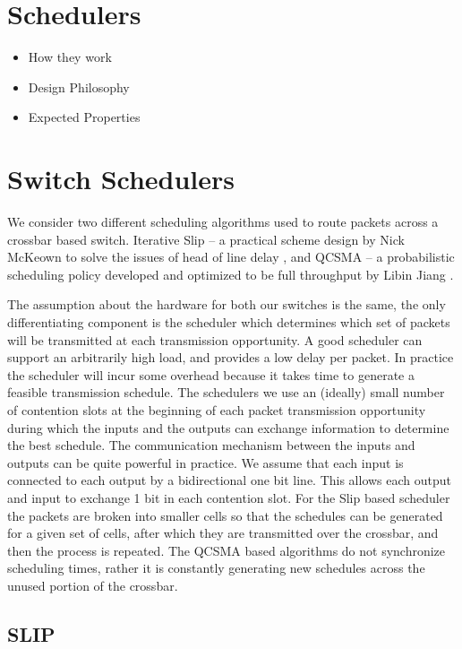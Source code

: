 \documentclass{IEEEtran}%
\begin{document}
\section{Schedulers}
\begin{itemize}
\item How they work
\item Design Philosophy
\item Expected Properties
\end{itemize}
\section{Switch Schedulers}
We consider two different scheduling algorithms used to route packets across a crossbar based switch.  Iterative Slip -- a practical scheme design by Nick McKeown to solve the issues of head of line delay \cite{McKeown}, and QCSMA -- a probabilistic scheduling policy developed and optimized to be full throughput by Libin Jiang \cite{Libin}.

The assumption about the hardware for both our switches is the same, the only differentiating component is the scheduler which determines which set of packets will be transmitted at each transmission opportunity.  A good scheduler can support an arbitrarily high load, and provides a low delay per packet.  In practice the scheduler will incur some overhead because it takes time to generate a feasible transmission schedule.  The schedulers we use an (ideally) small number of contention slots at the beginning of each packet transmission opportunity during which the inputs and the outputs can exchange information to determine the best schedule.  The communication mechanism between the inputs and outputs can be quite powerful in practice.  We assume that each input is connected to each output by a bidirectional one bit line. This allows each output and input to exchange 1 bit in each contention slot.  For the Slip based scheduler the packets are broken into smaller cells so that the schedules can be generated for a given set of cells, after which they are transmitted over the crossbar, and then the process is repeated.  The QCSMA based algorithms do not synchronize scheduling times, rather it is constantly generating new schedules across the unused portion of the crossbar.

\subsection{SLIP}
\end{document}
